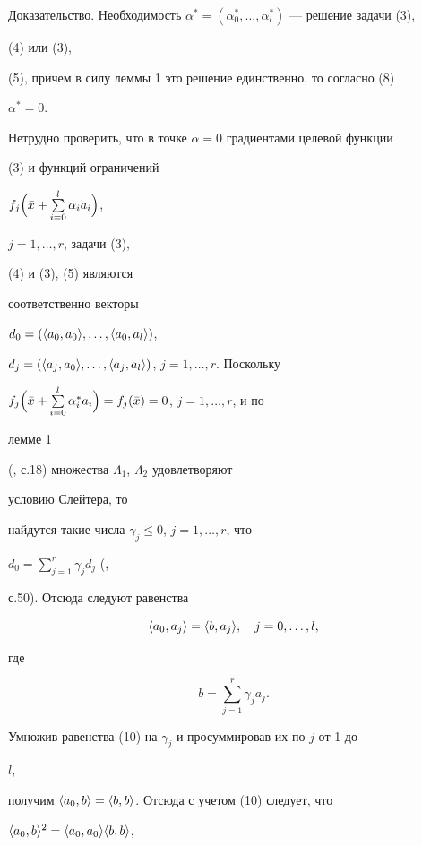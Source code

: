 \begin{pf*}{Доказательство. Необходимость}
$\alpha^*=(\alpha^*_0,\dotsc,\alpha^*_l)$ --- решение задачи (3),


(4) или (3),


(5), причем в силу леммы 1 это решение единственно, то согласно (8)


$\alpha^*=0$.


Нетрудно проверить, что в точке $\alpha=0$ градиентами целевой функции


(3) и функций ограничений


$f_j\Bigl(\Bar x+\sum\limits^l_{i=0}\alpha_ia_i\Bigr)$,


$j=1,\dotsc,r$, задачи (3),


(4) и (3), (5) являются


соответственно векторы


$d_0=(\langle a_0,a_0\rangle,\dotsc,\langle a_0,a_l\rangle)$,


$d_j=(\langle a_j,a_0\rangle,\dotsc,\langle a_j,a_l\rangle)$, $j=1,\dotsc,r$. Поскольку


$f_j\Bigl(\Bar x+\sum\limits^l_{i=0}\alpha^*_ia_i\Bigr)=


f_j(\Bar x)=0$, $j=1,\dotsc,r$, и по


лемме 1


(\cite{Zab}, с.18) множества $\Lambda_1$, $\Lambda_2$ удовлетворяют


условию Слейтера, то


найдутся такие числа $\gamma_j\le 0$, $j=1,\dotsc,r$, что


$d_0=\sum\limits^r_{j=1}\gamma_jd_j$ (\cite{Kar},


с.50). Отсюда следуют равенства


\begin{equation}


\la a_0,a_j\ra=\la b,a_j\ra,\quad j=0,\dotsc,l,


\end{equation}


где


\begin{equation}


b=\sum^r_{j=1}\gamma_ja_j.


\end{equation}


Умножив равенства (10) на $\gamma_j$ и просуммировав их по $j$ от 1 до


$l$,


получим $\langle a_0,b\rangle=\langle b,b\rangle$. Отсюда с учетом (10) следует, что


$\langle a_0,b\rangle^2=\langle a_0,a_0\rangle\langle b,b\rangle$,



\end{pf*}

